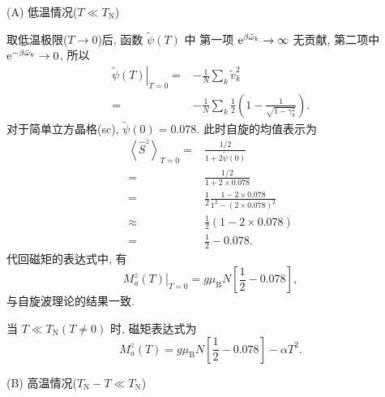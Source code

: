 (A) 低温情况($T\ll T_{\mathrm{N}}$)

取低温极限($T\to 0$)后, 函数 $\tilde\psi(T)$ 中 第一项 $\mathrm{e}^{\beta\tilde{\omega}_k}\to \infty$ 无贡献, 第二项中 $\mathrm{e}^{-\beta\tilde{\omega}_k}\to 0$, 所以 
 \begin{align}
        \left.\tilde{\psi}(T)\right|_{T=0}=&-\frac{1}{N}\sum_k\tilde{v}_k^2\nonumber\\
        =&-\frac{1}{N}\sum_k\frac{1}{2}\left( 1-\frac{1}{\sqrt{1-\gamma_k^2}} \right).
    \end{align} 
对于简单立方晶格(sc), $\tilde{\psi}(0)=0.078$. 此时自旋的均值表示为
\begin{align}
        \left\langle \hat S^z \right\rangle_{T=0}=&\frac{1/2}{1+2\tilde{\psi}(0)}\nonumber\\
        =&\frac{1/2}{1+2\times 0.078}\nonumber\\
        =&\frac{1}{2}\frac{1-2\times 0.078}{1^2-(2\times 0.078)^2}\nonumber\\
        \approx &\frac{1}{2}(1-2\times 0.078)\nonumber\\
        =&\frac{1}{2}-0.078.
    \end{align}
代回磁矩的表达式中, 有
\begin{equation}
    \left. M_a^z(T)\right|_{T=0}=g\mu_{\mathrm{B}}N\left[  \frac{1}{2}-0.078 \right],
\end{equation}
与自旋波理论的结果一致. 

当 $T\ll T_{\mathrm{N}}(T\ne 0)$ 时, 磁矩表达式为
\begin{equation}
    M_a^z(T)=g\mu_{\mathrm{B}}N\left[ \frac{1}{2}-0.078 \right]-\alpha T^2.
\end{equation} 


(B) 高温情况($T_{\mathrm{N}}-T\ll T_{\mathrm{N}}$)

